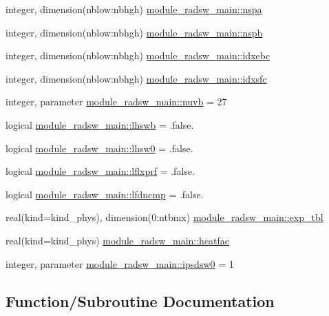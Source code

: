 \begin{DoxyCompactItemize}
\item 
integer, dimension(nblow\+:nbhgh) \hyperlink{namespacemodule__radsw__main_a4c0fc140a51c619089128f52e4bb878c}{module\+\_\+radsw\+\_\+main\+::nspa}
\item 
integer, dimension(nblow\+:nbhgh) \hyperlink{namespacemodule__radsw__main_a6be022a4a1ae32248d9721a9fff93db6}{module\+\_\+radsw\+\_\+main\+::nspb}
\item 
integer, dimension(nblow\+:nbhgh) \hyperlink{namespacemodule__radsw__main_aa20102786f7e7f8c71fb2783082eac1b}{module\+\_\+radsw\+\_\+main\+::idxebc}
\item 
integer, dimension(nblow\+:nbhgh) \hyperlink{namespacemodule__radsw__main_ad295d723dd7d269cb51c73923a4cbb94}{module\+\_\+radsw\+\_\+main\+::idxsfc}
\item 
integer, parameter \hyperlink{namespacemodule__radsw__main_a177282b3087dce2f54f1233ee8631231}{module\+\_\+radsw\+\_\+main\+::nuvb} = 27
\item 
logical \hyperlink{namespacemodule__radsw__main_a08bfecbd5edb2ad3ba0ae836cfe18d05}{module\+\_\+radsw\+\_\+main\+::lhswb} = .false.
\item 
logical \hyperlink{namespacemodule__radsw__main_a3fd8cae0d38772eea36ce6ec2d258997}{module\+\_\+radsw\+\_\+main\+::lhsw0} = .false.
\item 
logical \hyperlink{namespacemodule__radsw__main_ac4ab674edb40fda0c89aa8ee331ccdc6}{module\+\_\+radsw\+\_\+main\+::lflxprf} = .false.
\item 
logical \hyperlink{namespacemodule__radsw__main_a8c0a241d6c1aa69fee4cd24fdbc4256b}{module\+\_\+radsw\+\_\+main\+::lfdncmp} = .false.
\item 
real(kind=kind\+\_\+phys), dimension(0\+:ntbmx) \hyperlink{namespacemodule__radsw__main_a1f9d18b17cc24321ed1cf45254ac2b0f}{module\+\_\+radsw\+\_\+main\+::exp\+\_\+tbl}
\item 
real(kind=kind\+\_\+phys) \hyperlink{namespacemodule__radsw__main_aad60e753cdda20d4e84d063280f0dfcc}{module\+\_\+radsw\+\_\+main\+::heatfac}
\item 
integer, parameter \hyperlink{namespacemodule__radsw__main_ae1f88a0b60d69b892cfae83bb9ab67df}{module\+\_\+radsw\+\_\+main\+::ipsdsw0} = 1
\end{DoxyCompactItemize}


\subsection{Function/\+Subroutine Documentation}
